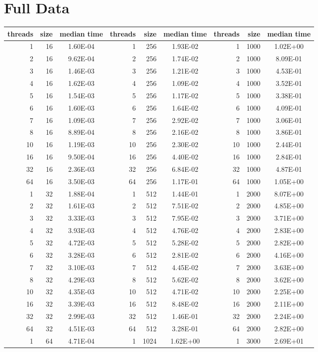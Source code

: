 \documentclass{article}
\begin{document}
\section{Full Data}
\begin{table}[]
    \centering
    \begin{tabular}{|r|r|c||r|r|c||r|r|c|}
    \hline
    threads&size&median time&threads&size&median time&threads&size&median time\\
\hline
1&16&1.60E-04&1&256&1.93E-02&1&1000&1.02E+00\\
2&16&9.62E-04&2&256&1.74E-02&2&1000&8.09E-01\\
3&16&1.46E-03&3&256&1.21E-02&3&1000&4.53E-01\\
4&16&1.62E-03&4&256&1.09E-02&4&1000&3.52E-01\\
5&16&1.54E-03&5&256&1.17E-02&5&1000&3.38E-01\\
6&16&1.60E-03&6&256&1.64E-02&6&1000&4.09E-01\\
7&16&1.09E-03&7&256&2.92E-02&7&1000&3.06E-01\\
8&16&8.89E-04&8&256&2.16E-02&8&1000&3.86E-01\\
10&16&1.19E-03&10&256&2.30E-02&10&1000&2.44E-01\\
16&16&9.50E-04&16&256&4.40E-02&16&1000&2.84E-01\\
32&16&2.36E-03&32&256&6.84E-02&32&1000&4.87E-01\\
64&16&3.50E-03&64&256&1.17E-01&64&1000&1.05E+00\\
\hline
1&32&1.88E-04&1&512&1.44E-01&1&2000&8.07E+00\\
2&32&1.61E-03&2&512&7.51E-02&2&2000&4.85E+00\\
3&32&3.33E-03&3&512&7.95E-02&3&2000&3.71E+00\\
4&32&3.93E-03&4&512&4.76E-02&4&2000&2.83E+00\\
5&32&4.72E-03&5&512&5.28E-02&5&2000&2.82E+00\\
6&32&3.28E-03&6&512&2.81E-02&6&2000&4.16E+00\\
7&32&3.10E-03&7&512&4.45E-02&7&2000&3.63E+00\\
8&32&4.29E-03&8&512&5.62E-02&8&2000&3.62E+00\\
10&32&4.35E-03&10&512&4.71E-02&10&2000&2.25E+00\\
16&32&3.39E-03&16&512&8.48E-02&16&2000&2.11E+00\\
32&32&2.99E-03&32&512&1.46E-01&32&2000&2.24E+00\\
64&32&4.51E-03&64&512&3.28E-01&64&2000&2.82E+00\\
\hline
1&64&4.71E-04&1&1024&1.62E+00&1&3000&2.69E+01\\

\end{tabular}
\end{table}
\end{document}
